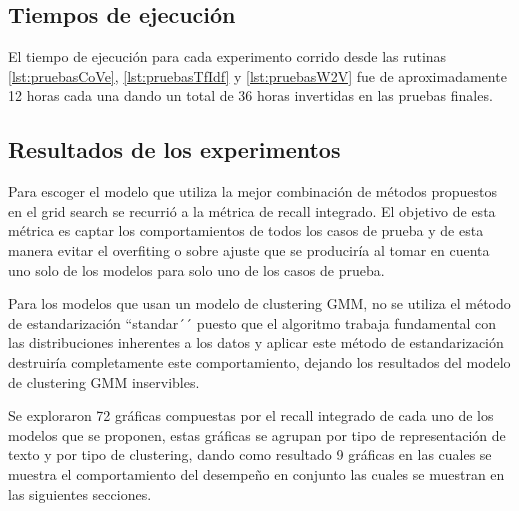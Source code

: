 \documentclass[12pt]{article}
\begin{document}
		\subsection{Tiempos de ejecución}
		El tiempo de ejecución para cada experimento corrido desde las rutinas \ref{lst:pruebasCoVe}, \ref{lst:pruebasTfIdf} y \ref{lst:pruebasW2V} fue de aproximadamente 12 horas cada una dando un total de 36 horas invertidas en las pruebas finales.
		
		\subsection{Resultados de los experimentos}		
		Para escoger el modelo que utiliza la mejor combinación de métodos propuestos en el grid search se recurrió a la métrica de recall integrado. El objetivo de esta métrica es captar los comportamientos de todos los casos de prueba y de esta manera evitar el overfiting o sobre ajuste que se produciría al tomar en cuenta uno solo de los modelos para solo uno de los casos de prueba.
		
		Para los modelos que usan un modelo de clustering GMM, no se utiliza el método de estandarización ``standar´´ puesto que el algoritmo trabaja fundamental con las distribuciones inherentes a los datos y aplicar este método de estandarización destruiría completamente este comportamiento, dejando los resultados del modelo de clustering GMM inservibles.
		
		Se exploraron 72 gráficas compuestas por el recall integrado de cada uno de los modelos que se proponen, estas gráficas se agrupan por tipo de representación de texto y por tipo de clustering, dando como resultado 9 gráficas en las cuales se muestra el comportamiento del desempeño en conjunto las cuales se muestran en las siguientes secciones.
		
\end{document}

